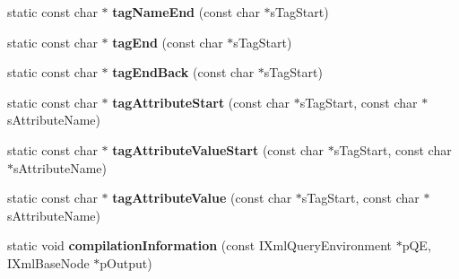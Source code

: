 \begin{DoxyCompactItemize}
\item 
\hypertarget{classgeneral__server_1_1Repository_a3c423d547aa3e7e6ca257447c8455766}{static const char $\ast$ {\bfseries tag\-Name\-End} (const char $\ast$s\-Tag\-Start)}\label{classgeneral__server_1_1Repository_a3c423d547aa3e7e6ca257447c8455766}

\item 
\hypertarget{classgeneral__server_1_1Repository_a264429e2e41b30b052eebcd30c787ff9}{static const char $\ast$ {\bfseries tag\-End} (const char $\ast$s\-Tag\-Start)}\label{classgeneral__server_1_1Repository_a264429e2e41b30b052eebcd30c787ff9}

\item 
\hypertarget{classgeneral__server_1_1Repository_a75fdd399ebe1da77de9a22655da7c1c4}{static const char $\ast$ {\bfseries tag\-End\-Back} (const char $\ast$s\-Tag\-Start)}\label{classgeneral__server_1_1Repository_a75fdd399ebe1da77de9a22655da7c1c4}

\item 
\hypertarget{classgeneral__server_1_1Repository_a284dae270712b6cd96e2cf2d3b224e87}{static const char $\ast$ {\bfseries tag\-Attribute\-Start} (const char $\ast$s\-Tag\-Start, const char $\ast$s\-Attribute\-Name)}\label{classgeneral__server_1_1Repository_a284dae270712b6cd96e2cf2d3b224e87}

\item 
\hypertarget{classgeneral__server_1_1Repository_ad23a9cc2d7fed52ac0c1c516c1ebaa88}{static const char $\ast$ {\bfseries tag\-Attribute\-Value\-Start} (const char $\ast$s\-Tag\-Start, const char $\ast$s\-Attribute\-Name)}\label{classgeneral__server_1_1Repository_ad23a9cc2d7fed52ac0c1c516c1ebaa88}

\item 
\hypertarget{classgeneral__server_1_1Repository_a4448408b51aee3c19b2f901860247cd2}{static const char $\ast$ {\bfseries tag\-Attribute\-Value} (const char $\ast$s\-Tag\-Start, const char $\ast$s\-Attribute\-Name)}\label{classgeneral__server_1_1Repository_a4448408b51aee3c19b2f901860247cd2}

\item 
\hypertarget{classgeneral__server_1_1Repository_a55c9aed1c5dc05b5a0c62fc09e74b79f}{static void {\bfseries compilation\-Information} (const \-I\-Xml\-Query\-Environment $\ast$p\-Q\-E, \-I\-Xml\-Base\-Node $\ast$p\-Output)}\label{classgeneral__server_1_1Repository_a55c9aed1c5dc05b5a0c62fc09e74b79f}

\end{DoxyCompactItemize}
